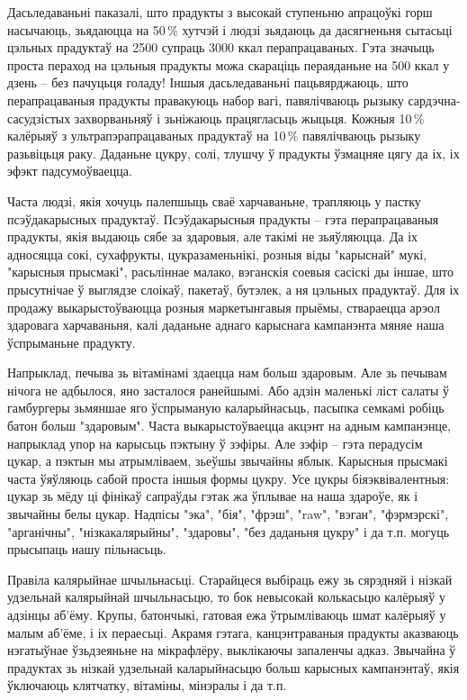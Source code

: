 Дасьледаваньні паказалі, што прадукты з высокай ступеньню апрацоўкі горш насычаюць, зьядаюцца на 50\,\% хутчэй і людзі зьядаюць да дасягненьня сытасьці цэльных прадуктаў на 2500 супраць 3000 ккал перапрацаваных. Гэта значыць проста пераход на цэльныя прадукты можа скараціць пераяданьне на 500 ккал у дзень – без пачуцьця голаду! Іншыя дасьледаваньні пацьвярджаюць, што перапрацаваныя прадукты правакуюць набор вагі, павялічваюць рызыку сардэчна-сасудзістых захворваньняў і зьніжаюць працягласьць жыцьця. Кожныя 10\,\% калёрыяў з ультрапэрапрацаваных прадуктаў на 10\,\% павялічваюць рызыку разьвіцьця раку. Даданьне цукру, солі, тлушчу ў прадукты ўзмацняе цягу да іх, іх эфэкт падсумоўваецца.

Часта людзі, якія хочуць палепшыць сваё харчаваньне, трапляюць у пастку псэўдакарысных прадуктаў. Псэўдакарысныя прадукты – гэта перапрацаваныя прадукты, якія выдаюць сябе за здаровыя, але такімі не зьяўляюцца. Да іх адносяцца сокі, сухафрукты, цукразаменьнікі, розныя віды "карыснай" мукі, "карысныя прысмакі", расьліннае малако, вэганскія соевыя сасіскі ды іншае, што прысутнічае ў выглядзе слоікаў, пакетаў, бутэлек, а ня цэльных прадуктаў. Для іх продажу выкарыстоўваюцца розныя маркетынгавыя прыёмы, ствараецца арэол здаровага харчаваньня, калі даданьне аднаго карыснага кампанэнта мяняе наша ўспрыманьне прадукту.

Напрыклад, печыва зь вітамінамі здаецца нам больш здаровым. Але зь печывам нічога не адбылося, яно засталося ранейшымі. Або адзін маленькі ліст салаты ў гамбургеры зьмяншае яго ўспрыманую каларыйнасьць, пасыпка семкамі робіць батон больш "здаровым". Часта выкарыстоўваецца акцэнт на адным кампанэнце, напрыклад упор на карысьць пэктыну ў зэфіры. Але зэфір – гэта перадусім цукар, а пэктын мы атрымліваем, зьеўшы звычайны яблык. Карысныя прысмакі часта ўяўляюць сабой проста іншыя формы цукру. Усе цукры біяэквівалентныя: цукар зь мёду ці фінікаў сапраўды гэтак жа ўплывае на наша здароўе, як і звычайны белы цукар. Надпісы "эка", "бія", "фрэш", "raw", "вэган", "фэрмэрскі", "арганічны", "нізкакалярыйны", "здаровы", "без даданьня цукру" і да т.п. могуць прысыпаць нашу пільнасьць.

Правіла калярыйнае шчыльнасьці. Старайцеся выбіраць ежу зь сярэдняй і нізкай удзельнай калярыйнай шчыльнасьцю, то бок невысокай колькасьцю калёрыяў у адзінцы аб'ёму. Крупы, батончыкі, гатовая ежа ўтрымліваюць шмат калёрыяў у малым аб'ёме, і іх пераесьці. Акрамя гэтага, канцэнтраваныя прадукты аказваюць нэгатыўнае ўзьдзеяньне на мікрафлёру, выклікаючы запаленчы адказ. Звычайна ў прадуктах зь нізкай удзельнай каларыйнасьцю больш карысных кампанэнтаў, якія ўключаюць клятчатку, вітаміны, мінэралы і да т.п.


